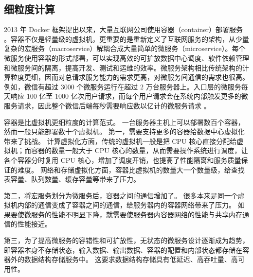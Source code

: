 
\subsection{细粒度计算}
\label{background:sec:datacenter-granular}

2013 年 Docker 框架提出以来，大量互联网公司使用容器（container）部署服务 \cite{bernstein2014containers}。容器不仅是轻量级的虚拟机，更重要的是重新定义了互联网服务的架构，从少量复杂的宏服务（macroservice）解耦合成大量简单的微服务（microservice）。每个微服务使用容器的形式部署，可以实现高效的可扩放数据中心调度、软件依赖管理和微服务间的隔离，提高开发、测试和运维的效率。微服务架构相比传统架构的计算粒度更细，因而对总请求服务能力的需求更高，对微服务间通信的需求也很高。
例如，微信有超过 3000 个微服务运行在超过 2 万台服务器上。入口层的微服务每天响应 100 亿至 1000 亿次用户请求，而每个用户请求会在系统内部触发更多的微服务请求，因此整个微信后端每秒需要响应数以亿计的微服务请求 \cite{zhou2018overload}。

容器是比虚拟机更细粒度的计算范式。
一台服务器主机上可以部署数百个容器，然而一般只能部署数十个虚拟机。
第一，需要支持更多的容器给数据中心虚拟化带来了挑战。
计算虚拟化方面，传统的虚拟机一般是把 CPU 核心直接分配给虚拟机；而容器的数量一般大于 CPU 核心的数量，从而需要操作系统进行调度，让各个容器分时复用 CPU 核心，增加了调度开销，也提高了性能隔离和服务质量保证的难度。
网络和存储虚拟化方面，容器比虚拟机的数量大一个数量级，给查找表容量、队列数量、缓存容量等带来了压力。

第二，将宏服务划分为微服务后，容器之间的通信增加了。
很多本来是同一个虚拟机内部的通信变成了容器之间的通信，给服务器内的容器网络带来了压力。
如果要使微服务的性能不明显下降，就需要使服务器内容器网络的性能与共享内存通信的性能接近。

第三，为了提高微服务的容错性和可扩放性，无状态的微服务设计逐渐成为趋势，即容器本身不存储状态，输入数据、输出数据、容器的配置和内部状态都存储在容器外的数据结构存储服务中。
这要求数据结构存储具有低延迟、高吞吐量、高可用性。

